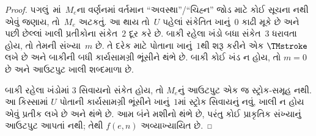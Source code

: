 \documentclass[../../../include/open-logic-section]{subfiles}
\begin{document}
\begin{proof}
  પગલું~માં~$M_e$ના વર્ણનમાં વર્તમાન
  ``અવસ્થા''/``ચિહ્ન'' જોડ માટે કોઈ સૂચના નથી એવું જણાય,
  તો~$M_e$ અટકતું. આ થાય તો~$U$ પહેલાં સંકેતિત
  ખાનું~$0$ કાઢી મૂકે છે અને પછી છેલ્લાં ખાલી પ્રતીકોના
  સંકેત~$2$ દૂર કરે છે. બાકી રહેલા ખંડો બધા સંકેત~$3$
  ધરાવતા હોય, તો તેમની સંખ્યા~$m$ છે. તે દરેક માટે પોતાના
  ખાનું~$1$થી શરૂ કરીને એક $\TMstroke$ લખે છે અને બાકીની
  બધી કાર્યસામગ્રી ભૂંસીને થંભે છે. બાકી કોઈ ખંડ ન હોય,
  તો $m=0$ છે અને આઉટપુટ ખાલી શબ્દમાળા છે.

  બાકી રહેલા ખંડોમાં $3$ સિવાયનો સંકેત હોય, તો
  $M_e$નું આઉટપુટ એક જ સ્ટ્રોક-સમૂહ નથી. આ કિસ્સામાં
  $U$ પોતાની કાર્યસામગ્રી ભૂંસીને ખાનું~$1$માં સ્ટ્રોક
  સિવાયનું નવું, ખાલી ન હોય એવું પ્રતીક લખે છે અને થંભે છે.
  આમ બંને મશીનો થંભે છે, પરંતુ કોઈ પ્રાકૃતિક સંખ્યાનું
  આઉટપુટ આપતાં નથી; તેથી $f(e,n)$ અવ્યાખ્યાયિત છે.
\end{proof}
\end{document}
